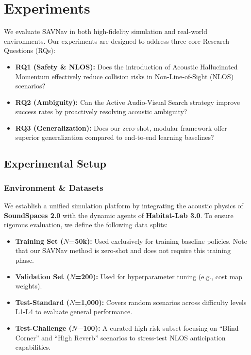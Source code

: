 \section{Experiments}
\label{sec:experiments}

We evaluate SAVNav in both high-fidelity simulation and real-world environments. Our experiments are designed to address three core Research Questions (RQs):
\begin{itemize}
    \item \textbf{RQ1 (Safety \& NLOS):} Does the introduction of Acoustic Hallucinated Momentum effectively reduce collision risks in Non-Line-of-Sight (NLOS) scenarios?
    \item \textbf{RQ2 (Ambiguity):} Can the Active Audio-Visual Search strategy improve success rates by proactively resolving acoustic ambiguity?
    \item \textbf{RQ3 (Generalization):} Does our zero-shot, modular framework offer superior generalization compared to end-to-end learning baselines?
\end{itemize}

\subsection{Experimental Setup}

\subsubsection{Environment \& Datasets}
We establish a unified simulation platform by integrating the acoustic physics of \textbf{SoundSpaces 2.0} with the dynamic agents of \textbf{Habitat-Lab 3.0}. To ensure rigorous evaluation, we define the following data splits:
\begin{itemize}
    \item \textbf{Training Set ($N$=50k):} Used exclusively for training baseline policies. Note that our SAVNav method is zero-shot and does not require this training phase.
    \item \textbf{Validation Set ($N$=200):} Used for hyperparameter tuning (e.g., cost map weights).
    \item \textbf{Test-Standard ($N$=1,000):} Covers random scenarios across difficulty levels L1-L4 to evaluate general performance.
    \item \textbf{Test-Challenge ($N$=100):} A curated high-risk subset focusing on ``Blind Corner'' and ``High Reverb'' scenarios to stress-test NLOS anticipation capabilities.
\end{itemize}

